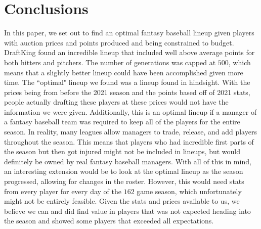 
\section{Conclusions}
\label{sec:concl}

In this paper, we set out to find an optimal fantasy baseball lineup given players with auction prices and points produced and being constrained to budget. DraftKing found an incredible lineup that included well above average points for both hitters and pitchers. The number of generations was capped at $500$, which means that a slightly better lineup could have been accomplished given more time. The “optimal" lineup we found was a lineup found in hindsight. With the prices being from before the 2021 season and the points based off of 2021 stats, people actually drafting these players at these prices would not have the information we were given. Additionally, this is an optimal lineup if a manager of a fantasy baseball team was required to keep all of the players for the entire season. In reality, many leagues allow managers to trade, release, and add players throughout the season. This means that players who had incredible first parts of the season but then got injured might not be included in lineups, but would definitely be owned by real fantasy baseball managers. With all of this in mind, an interesting extension would be to look at the optimal lineup as the season progressed, allowing for changes in the roster. However, this would need stats from every player for every day of the $162$ game season, which unfortunately might not be entirely feasible. Given the stats and prices available to us, we believe we can and did find value in players that was not expected heading into the season and showed some players that exceeded all expectations.